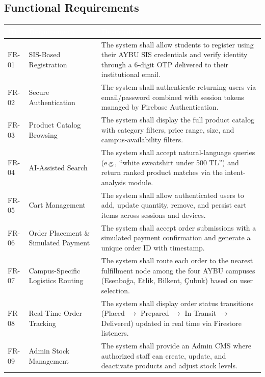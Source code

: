 \documentclass[11pt,a4paper]{article}
\begin{document}
\subsection{Functional Requirements}
\renewcommand{\arraystretch}{1.2}
\begin{longtable}{|p{}|p{}|p{}|}
\hline
\rowcolor{aybuHeader}
\textcolor{white}{\textbf{ID}} &
\textcolor{white}{\textbf{Requirement}} &
\textcolor{white}{\textbf{Description}} \\ \hline \endhead
FR-01 & SIS-Based Registration & The system shall allow students to register using their AYBU SIS credentials and verify identity through a 6-digit OTP delivered to their institutional email. \\ \hline
FR-02 & Secure Authentication & The system shall authenticate returning users via email/password combined with session tokens managed by Firebase Authentication. \\ \hline
FR-03 & Product Catalog Browsing & The system shall display the full product catalog with category filters, price range, size, and campus-availability filters. \\ \hline
FR-04 & AI-Assisted Search & The system shall accept natural-language queries (e.g., ``white sweatshirt under 500 TL'') and return ranked product matches via the intent-analysis module. \\ \hline
FR-05 & Cart Management & The system shall allow authenticated users to add, update quantity, remove, and persist cart items across sessions and devices. \\ \hline
FR-06 & Order Placement \& Simulated Payment & The system shall accept order submissions with a simulated payment confirmation and generate a unique order ID with timestamp. \\ \hline
FR-07 & Campus-Specific Logistics Routing & The system shall route each order to the nearest fulfillment node among the four AYBU campuses (Esenboğa, Etlik, Bilkent, Çubuk) based on user selection. \\ \hline
FR-08 & Real-Time Order Tracking & The system shall display order status transitions (Placed $\rightarrow$ Prepared $\rightarrow$ In-Transit $\rightarrow$ Delivered) updated in real time via Firestore listeners. \\ \hline
FR-09 & Admin Stock Management & The system shall provide an Admin CMS where authorized staff can create, update, and deactivate products and adjust stock levels. \\ \hline

\end{longtable}
\end{document}
